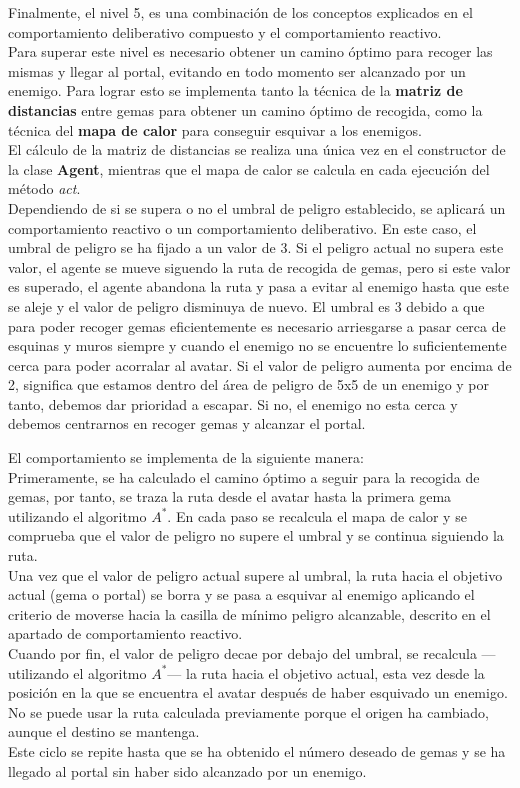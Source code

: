 Finalmente, el nivel 5, es una combinación de los conceptos explicados en el comportamiento deliberativo compuesto y el comportamiento reactivo.\\
Para superar este nivel es necesario obtener un camino óptimo para recoger las mismas y llegar al portal, evitando en todo momento ser alcanzado por un enemigo. Para lograr esto se implementa tanto la técnica de la \textbf{matriz de distancias} entre gemas para obtener un camino óptimo de recogida, como la técnica del \textbf{mapa de calor} para conseguir esquivar a los enemigos.\\
El cálculo de la matriz de distancias se realiza una única vez en el constructor de la clase \textbf{Agent}, mientras que el mapa de calor se calcula en cada ejecución del método \emph{act}.\\

Dependiendo de si se supera o no el umbral de peligro establecido, se aplicará un comportamiento reactivo o un comportamiento deliberativo. En este caso, el umbral de peligro se ha fijado a un valor de 3. Si el peligro actual no supera este valor, el agente se mueve siguendo la ruta de recogida de gemas, pero si este valor es superado, el agente abandona la ruta y pasa a evitar al enemigo hasta que este se aleje y el valor de peligro disminuya de nuevo. El umbral es 3 debido a que para poder recoger gemas eficientemente es necesario arriesgarse a pasar cerca de esquinas y muros siempre y cuando el enemigo no se encuentre lo suficientemente cerca para poder acorralar al avatar. Si el valor de peligro aumenta por encima de 2, significa que estamos dentro del área de peligro de 5x5 de un enemigo y por tanto, debemos dar prioridad a escapar. Si no, el enemigo no esta cerca y debemos centrarnos en recoger gemas y alcanzar el portal.

El comportamiento se implementa de la siguiente manera:\\
Primeramente, se ha calculado el camino óptimo a seguir para la recogida de gemas, por tanto, se traza la ruta desde el avatar hasta la primera gema utilizando el algoritmo $ A^{*} $. En cada paso se recalcula el mapa de calor y se comprueba que el valor de peligro no supere el umbral y se continua siguiendo la ruta.\\
Una vez que el valor de peligro actual supere al umbral, la ruta hacia el objetivo actual (gema o portal) se borra y se pasa a esquivar al enemigo aplicando el criterio de moverse hacia la casilla de mínimo peligro alcanzable, descrito en el apartado de comportamiento reactivo.\\
Cuando por fin, el valor de peligro decae por debajo del umbral, se recalcula ---utilizando el algoritmo $ A^{*} $--- la ruta hacia el objetivo actual, esta vez desde la posición en la que se encuentra el avatar después de haber esquivado un enemigo. No se puede usar la ruta calculada previamente porque el origen ha cambiado, aunque el destino se mantenga.\\

Este ciclo se repite hasta que se ha obtenido el número deseado de gemas y se ha llegado al portal sin haber sido alcanzado por un enemigo.
